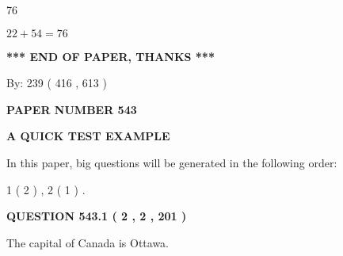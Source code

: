 \documentclass[12pt]{article}
\begin{document}
 
\noindent{}

76
 
 
 
 
\noindent{}

$ %
22 +  %
54=   %
76$
 
 
   
   
 \vspace{0.2in}
 
   
   
   
   
\vspace{1.0in} 
{\textbf{\large{ *** END OF PAPER, THANKS *** }}} 
   
   
\hspace{1.0in} By: 
 239 ( 416 ,  613 )
   
   
   
   
\newpage 
\setcounter{page}{ 
   543001 } 
   
   
   
   
 {\textbf{ \Large{ PAPER NUMBER  543  }}}
   
   
\vspace{0.2in}
   
   
   
   
   
   
 \vspace{0.2in}
{\LARGE {\textbf{ A QUICK TEST EXAMPLE}}}
   
   
   
\vspace{0.2in}
   
In this paper, big questions will be generated in the following order: 
   
   
   1 ( 2 )
 ,
   2 ( 1 )
 .
  
\vspace{0.2in}
  
{\textbf{\Large{QUESTION
543.1 
 ( 2 , 2 , 201 )
}}}
  
  
 
 
\noindent{}
 
 
The capital of Canada is Ottawa.
 
 
 
\end{document}
